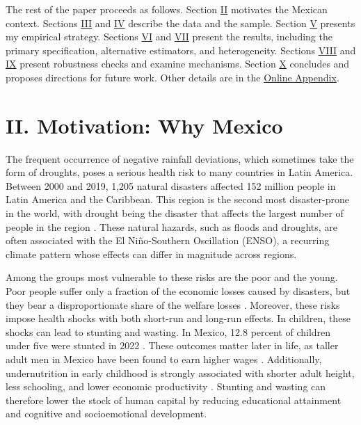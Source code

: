 \documentclass[12pt]{article}
\begin{document}
The rest of the paper proceeds as follows. Section \hyperref[sec:II]{II} motivates the Mexican context. Sections \hyperref[sec:III]{III} and \hyperref[sec:IV]{IV} describe the data and the sample. Section \hyperref[sec:V]{V} presents my empirical strategy. Sections \hyperref[sec:VI]{VI} and \hyperref[sec:VII]{VII} present the results, including the primary specification, alternative estimators, and heterogeneity. Sections \hyperref[sec:VIII]{VIII} and \hyperref[sec:IX]{IX} present robustness checks and examine mechanisms. Section \hyperref[sec:X]{X} concludes and proposes directions for future work. Other details are in the \href{https://zakserby.github.io/Not-Only-Extremes-How-Moderate-Rainfall-Deficits-Affect-Child-Health-in-Mexico/viewer/web/viewer.html?file=../../Online_Appendix.pdf}{Online Appendix}.

\section*{II. Motivation: Why Mexico}\label{sec:II}

The frequent occurrence of negative rainfall deviations, which sometimes take the form of droughts, poses a serious health risk to many countries in Latin America. Between 2000 and 2019, 1,205 natural disasters affected 152 million people in Latin America and the Caribbean. This region is the second most disaster-prone in the world, with drought being the disaster that affects the largest number of people in the region \parencite{ochaNaturalDisastersLatin2020}. These natural hazards, such as floods and droughts, are often associated with the El Ni\~no-Southern Oscillation (ENSO), a recurring climate pattern whose effects can differ in magnitude across regions.

Among the groups most vulnerable to these risks are the poor and the young. Poor people suffer only a fraction of the economic losses caused by disasters, but they bear a disproportionate share of the welfare losses \parencite{hallegatteUnbreakableBuildingResilience2017}. Moreover, these risks impose health shocks with both short-run and long-run effects. In children, these shocks can lead to stunting and wasting. In Mexico, 12.8 percent of children under five were stunted in 2022 \parencite{cuevas-nasuEstadoNutricionNinas2023}. These outcomes matter later in life, as taller adult men in Mexico have been found to earn higher wages \parencite{voglHeightSkillsLabor2014}. Additionally, undernutrition in early childhood is strongly associated with shorter adult height, less schooling, and lower economic productivity \parencite{victoraMaternalChildUndernutrition2008}. Stunting and wasting can therefore lower the stock of human capital by reducing educational attainment and cognitive and socioemotional development.
\end{document}
